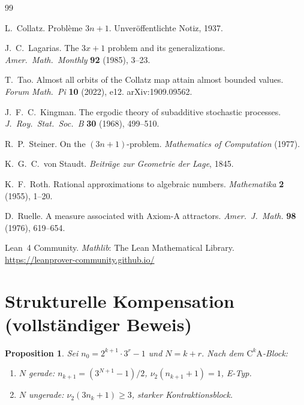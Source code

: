 \documentclass[12pt,a4paper]{article}
\newtheorem{proposition}[satz]{Proposition}
\newcommand{\vii}{\nu_2}
\begin{document}
\begin{thebibliography}{99}

L.~Collatz.
Problème $3n+1$.
Unveröffentlichte Notiz, 1937.

J.~C.~Lagarias.
The $3x+1$ problem and its generalizations.
\textit{Amer.\ Math.\ Monthly} \textbf{92} (1985), 3--23.

T.~Tao.
Almost all orbits of the Collatz map attain almost bounded values.
\textit{Forum Math.\ Pi} \textbf{10} (2022), e12.
arXiv:1909.09562.

J.~F.~C.~Kingman.
The ergodic theory of subadditive stochastic processes.
\textit{J.\ Roy.\ Stat.\ Soc.\ B} \textbf{30} (1968), 499--510.

R.~P.~Steiner.
On the $(3n+1)$-problem.
\textit{Mathematics of Computation} (1977).

K.~G.~C.~von Staudt.
\textit{Beiträge zur Geometrie der Lage}, 1845.

K.~F.~Roth.
Rational approximations to algebraic numbers.
\textit{Mathematika} \textbf{2} (1955), 1--20.

D.~Ruelle.
A measure associated with Axiom-A attractors.
\textit{Amer.\ J.\ Math.} \textbf{98} (1976), 619--654.

Lean~4 Community.
\textit{Mathlib}: The Lean Mathematical Library.
\url{https://leanprover-community.github.io/}

\end{thebibliography}

\appendix

\section{Strukturelle Kompensation (vollständiger Beweis)}
\label{anhang:kompensation}

\begin{proposition}
Sei $n_0 = 2^{k+1}\cdot 3^r - 1$ und $N = k+r$. Nach dem
$\mathrm{C}^k\mathrm{A}$-Block:
\begin{enumerate}[label=(\roman*)]
  \item $N$ gerade: $n_{k+1} = (3^{N+1}-1)/2$, $\vii(n_{k+1}+1)=1$, E-Typ.
  \item $N$ ungerade: $\vii(3n_k+1) \geq 3$, starker Kontraktionsblock.
\end{enumerate}
\end{proposition}
\end{document}

